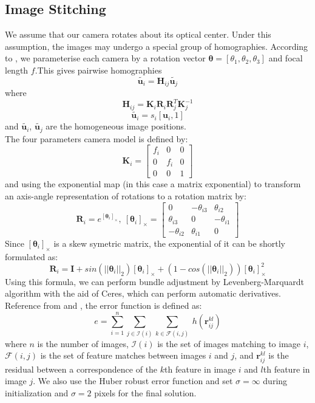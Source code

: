\documentclass[11pt]{article}
\begin{document}
\subsection{Image Stitching}
We assume that our camera rotates about its optical center.  Under this assumption, the images may undergo a special group of homographies.
According to \cite{ref:panorama0}\cite{ref:panorama1}, we parameterise each camera by a rotation vector $\boldsymbol{\theta} = [\theta_1, \theta_2, \theta_3]$ and focal length $f$.This gives pairwise homographies $$\tilde{\boldsymbol{u}_i} = \boldsymbol{H}_{ij}\tilde{\boldsymbol{u}_j}$$ 
where $$\boldsymbol{H}_{ij} = \boldsymbol{K}_i\boldsymbol{R}_i\boldsymbol{R}^T_j\boldsymbol{K}^{-1}_j$$ $$\tilde{\boldsymbol{u}_i} = s_i[\boldsymbol{u}_i, 1]$$ 
and $\tilde{\boldsymbol{u}_i}$, $\tilde{\boldsymbol{u}_j}$ are the homogeneous image positions. \\
The four parameters camera model is defined by:
$$\boldsymbol{K}_i = \begin{bmatrix} 
  f_i &   0 & 0 \\ 
    0 & f_i & 0 \\ 
    0 &   0 & 1 \end{bmatrix}$$
and using the exponential map (in this case a matrix exponential) to transform an axis-angle representation of rotations to a rotation matrix by:
$$\boldsymbol{R}_i = e^{[\boldsymbol{\theta}_i]_{\times}},\ 
[\boldsymbol{\theta}_i]_{\times} = \begin{bmatrix} 
  0 & -\theta_{i3} & \theta_{i2} \\
  \theta_{i3} & 0 & -\theta_{i1} \\
-\theta_{i2} & \theta_{i1} & 0 \end{bmatrix}$$
Since $[\boldsymbol{\theta}_i]_{\times}$ is a skew symetric matrix, the exponential of it can be shortly formulated as:
$$\boldsymbol{R}_i = 
\boldsymbol{I} + 
sin({||\boldsymbol{\theta}_i||}_2)[\boldsymbol{\theta}_i]_{\times} +
(1-cos({||\boldsymbol{\theta}_i||}_2))[\boldsymbol{\theta}_i]^2_{\times}$$
Using this formula, we can perform bundle adjustment by Levenberg-Marquardt algorithm with the aid of Ceres, which can perform automatic derivatives.
Reference from \cite{ref:panorama0} and \cite{ref:panorama1}, the error function is defined as:
$$e = \sum\limits_{i=1}^n\sum\limits_{j \in \mathscr{I}(i)}\sum\limits_{k \in \mathscr{F}(i,j)}\ h(\boldsymbol{r}^{kl}_{ij})$$
where $n$ is the number of images, $\mathscr{I}(i)$ is the set of images matching to image $i$, $\mathscr{F}(i, j)$ is the set of feature matches between images $i$ and $j$, and $\boldsymbol{r}^{kl}_{ij}$ is the residual between a correspondence of the $k$th feature in image $i$ and $l$th feature in image $j$. We also use the Huber robust error function and set $\sigma = \infty$ during initialization and $\sigma = 2$ pixels for the final solution.
\end{document}
